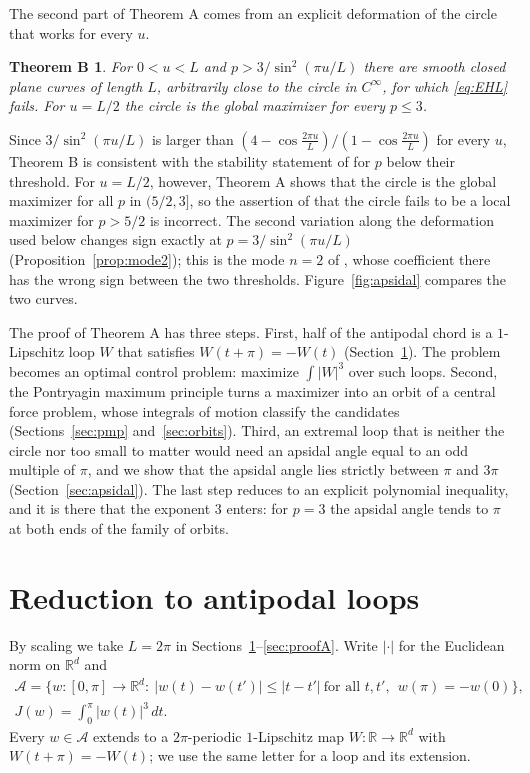 \documentclass[11pt]{amsart}
\newtheorem*{theoremB}{Theorem B}
\theoremstyle{definition}
\theoremstyle{remark}
\newcommand{\R}{\mathbb{R}}
\newcommand{\cA}{\mathcal{A}}
\begin{document}
The second part of Theorem A comes from an explicit deformation of the circle that works for every $u$.

\begin{theoremB}
For $0<u<L$ and $p>3/\sin^2(\pi u/L)$ there are smooth closed plane curves of length $L$, arbitrarily close to the circle in $C^\infty$, for which \eqref{eq:EHL} fails. For $u=L/2$ the circle is the global maximizer for every $p\le3$.
\end{theoremB}

Since $3/\sin^2(\pi u/L)$ is larger than $(4-\cos\frac{2\pi u}L)/(1-\cos\frac{2\pi u}L)$ for every $u$, Theorem B is consistent with the stability statement of \cite{EFH07} for $p$ below their threshold. For $u=L/2$, however, Theorem A shows that the circle is the global maximizer for all $p$ in $(5/2,3]$, so the assertion of \cite{EFH07} that the circle fails to be a local maximizer for $p>5/2$ is incorrect. The second variation along the deformation used below changes sign exactly at $p=3/\sin^2(\pi u/L)$ (Proposition~\ref{prop:mode2}); this is the mode $n=2$ of \cite{EFH07}, whose coefficient there has the wrong sign between the two thresholds. Figure~\ref{fig:apsidal} compares the two curves.

The proof of Theorem A has three steps. First, half of the antipodal chord is a $1$-Lipschitz loop $W$ that satisfies $W(t+\pi)=-W(t)$ (Section~\ref{sec:reduction}). The problem becomes an optimal control problem: maximize $\int|W|^3$ over such loops. Second, the Pontryagin maximum principle turns a maximizer into an orbit of a central force problem, whose integrals of motion classify the candidates (Sections~\ref{sec:pmp} and~\ref{sec:orbits}). Third, an extremal loop that is neither the circle nor too small to matter would need an apsidal angle equal to an odd multiple of $\pi$, and we show that the apsidal angle lies strictly between $\pi$ and $3\pi$ (Section~\ref{sec:apsidal}). The last step reduces to an explicit polynomial inequality, and it is there that the exponent $3$ enters: for $p=3$ the apsidal angle tends to $\pi$ at both ends of the family of orbits.

\section{Reduction to antipodal loops}\label{sec:reduction}

By scaling we take $L=2\pi$ in Sections~\ref{sec:reduction}--\ref{sec:proofA}. Write $|\cdot|$ for the Euclidean norm on $\R^d$ and
\begin{gather*}
\cA=\bigl\{w\colon[0,\pi]\to\R^d:\ |w(t)-w(t')|\le|t-t'|\ \text{for all }t,t',\ \ w(\pi)=-w(0)\bigr\},\\
J(w)=\int_0^\pi|w(t)|^3\,dt .
\end{gather*}
Every $w\in\cA$ extends to a $2\pi$-periodic $1$-Lipschitz map $W\colon\R\to\R^d$ with $W(t+\pi)=-W(t)$; we use the same letter for a loop and its extension.
\end{document}
